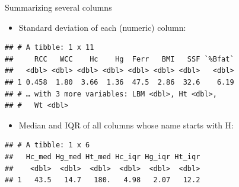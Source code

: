 \documentclass[
  ignorenonframetext,
]{beamer}
\newenvironment{Shaded}{\begin{snugshade}}{\end{snugshade}}
\newcommand{\DataTypeTok}[1]{\textcolor[rgb]{0.13,0.29,0.53}{#1}}
\newcommand{\KeywordTok}[1]{\textcolor[rgb]{0.13,0.29,0.53}{\textbf{#1}}}
\newcommand{\NormalTok}[1]{#1}
\newcommand{\OperatorTok}[1]{\textcolor[rgb]{0.81,0.36,0.00}{\textbf{#1}}}
\newcommand{\StringTok}[1]{\textcolor[rgb]{0.31,0.60,0.02}{#1}}
\providecommand{\tightlist}{%
  \setlength{\itemsep}{0pt}\setlength{\parskip}{0pt}}
\begin{document}
\begin{frame}[fragile]{Summarizing several columns}
\protect\hypertarget{summarizing-several-columns}{}

\begin{itemize}
\tightlist
\item
  Standard deviation of each (numeric) column:
\end{itemize}

\small

\begin{Shaded}
\end{Shaded}

\begin{verbatim}
## # A tibble: 1 x 11
##     RCC   WCC    Hc    Hg  Ferr   BMI   SSF `%Bfat`
##   <dbl> <dbl> <dbl> <dbl> <dbl> <dbl> <dbl>   <dbl>
## 1 0.458  1.80  3.66  1.36  47.5  2.86  32.6    6.19
## # … with 3 more variables: LBM <dbl>, Ht <dbl>,
## #   Wt <dbl>
\end{verbatim}

\normalsize

\begin{itemize}
\tightlist
\item
  Median and IQR of all columns whose name starts with H:
\end{itemize}

\small

\begin{Shaded}
\end{Shaded}

\begin{verbatim}
## # A tibble: 1 x 6
##   Hc_med Hg_med Ht_med Hc_iqr Hg_iqr Ht_iqr
##    <dbl>  <dbl>  <dbl>  <dbl>  <dbl>  <dbl>
## 1   43.5   14.7   180.   4.98   2.07   12.2
\end{verbatim}

\normalsize

\end{frame}
\end{document}
